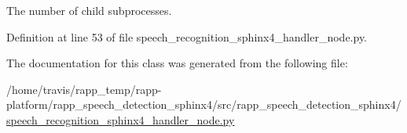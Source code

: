 The number of child subprocesses. 



Definition at line 53 of file speech\-\_\-recognition\-\_\-sphinx4\-\_\-handler\-\_\-node.\-py.



The documentation for this class was generated from the following file\-:\begin{DoxyCompactItemize}
\item 
/home/travis/rapp\-\_\-temp/rapp-\/platform/rapp\-\_\-speech\-\_\-detection\-\_\-sphinx4/src/rapp\-\_\-speech\-\_\-detection\-\_\-sphinx4/\hyperlink{speech__recognition__sphinx4__handler__node_8py}{speech\-\_\-recognition\-\_\-sphinx4\-\_\-handler\-\_\-node.\-py}\end{DoxyCompactItemize}
